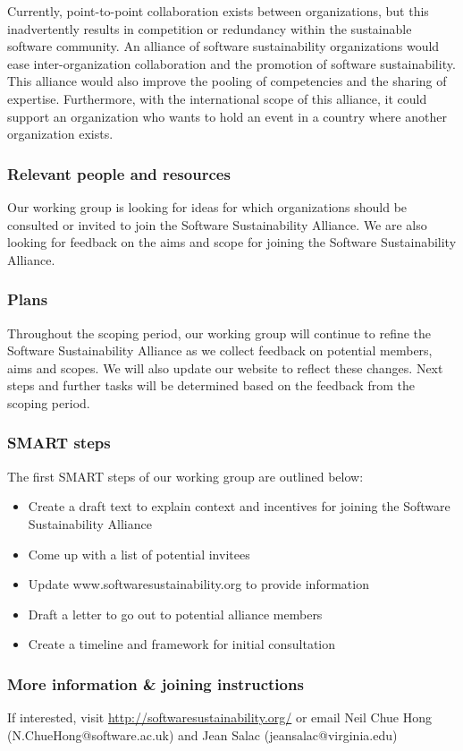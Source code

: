 Currently, point-to-point collaboration exists between organizations, but this inadvertently results in competition or redundancy within the sustainable software community. An alliance of software sustainability organizations would ease inter-organization collaboration and the promotion of software sustainability. This alliance would also improve the pooling of competencies and the sharing of expertise. Furthermore, with the international scope of this alliance, it could support an organization who wants to hold an event in a country where another organization exists.

\subsubsection{Relevant people and resources}

Our working group is looking for ideas for which organizations should be consulted or invited to join the Software Sustainability Alliance. We are also looking for feedback on the aims and scope for joining the Software Sustainability Alliance.

\subsubsection{Plans}

Throughout the scoping period, our working group will continue to refine the Software Sustainability Alliance as we collect feedback on potential members, aims and scopes. We will also update our website to reflect these changes. Next steps and further tasks will be determined based on the feedback from the scoping period.

\subsubsection{SMART steps}

The first SMART steps of our working group are outlined below:
\begin{itemize}
\item Create a draft text to explain context and incentives for joining the Software Sustainability Alliance
\item Come up with a list of potential invitees
\item Update www.softwaresustainability.org to provide information
\item Draft a letter to go out to potential alliance members
\item Create a timeline and framework for initial consultation
\end{itemize}

\subsubsection{More information \& joining instructions}

If interested, visit \url{http://softwaresustainability.org/} or email Neil Chue Hong (N.ChueHong@software.ac.uk) and Jean Salac (jeansalac@virginia.edu)
